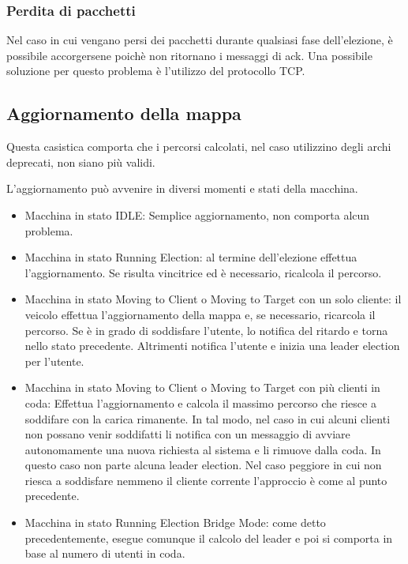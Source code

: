\subsubsection{Perdita di pacchetti}
Nel caso in cui vengano persi dei pacchetti durante qualsiasi fase dell'elezione, è possibile accorgersene poichè non ritornano i messaggi di ack. Una possibile soluzione per questo problema è l'utilizzo del protocollo TCP.

\subsection{Aggiornamento della mappa}\label{aggiornamento_mappa}

Questa casistica comporta che i percorsi calcolati, nel caso utilizzino degli archi deprecati, non siano più validi. 

L'aggiornamento può avvenire in diversi momenti e stati della macchina. 

\begin{itemize}
	\item Macchina in stato IDLE: Semplice aggiornamento, non comporta alcun problema.
	\item Macchina in stato Running Election: al termine dell'elezione effettua l'aggiornamento. Se risulta vincitrice ed è necessario, ricalcola il percorso.
	\item Macchina in stato Moving to Client o Moving to Target con un solo cliente: il veicolo effettua l'aggiornamento della mappa e, se necessario, ricarcola il percorso. Se è in grado di soddisfare l'utente, lo notifica del ritardo e torna nello stato precedente. Altrimenti notifica l'utente e inizia una leader election per l'utente.
	\item Macchina in stato Moving to Client o Moving to Target con più clienti in coda: Effettua l'aggiornamento e calcola il massimo percorso che riesce a soddifare con la carica rimanente. In tal modo, nel caso in cui alcuni clienti non possano venir soddifatti li notifica con un messaggio di avviare autonomamente una nuova richiesta al sistema e li rimuove dalla coda. In questo caso non parte alcuna leader election. Nel caso peggiore in cui non riesca a soddisfare nemmeno il cliente corrente l'approccio è come al punto precedente.
	\item Macchina in stato Running Election Bridge Mode: come detto precedentemente, esegue comunque il calcolo del leader e poi si comporta in base al numero di utenti in coda.
\end{itemize}

